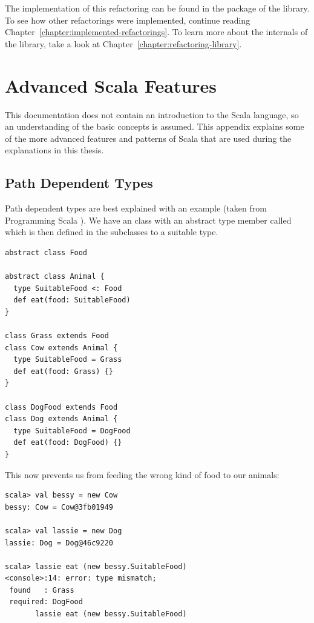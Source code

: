 \documentclass[10pt,a4paper,oneside]{scrreprt}
\begin{document}
The implementation of this refactoring can be found in the  package of the library. To see how other refactorings were implemented, continue reading Chapter~\vref{chapter:implemented-refactorings}. To learn more about the internals of the library, take a look at Chapter~\vref{chapter:refactoring-library}.

\label{end-chapter:developer-how-to}




\chapter{Advanced Scala Features} \label{chapter:advanced-scala-features}

This documentation does not contain an introduction to the Scala language, so an understanding of the basic concepts is assumed. This appendix explains some of the more advanced features and patterns of Scala that are used during the explanations in this thesis.

\section{Path Dependent Types} \label{section:path-dependent-types}

Path dependent types are best explained with an example (taken from Programming Scala \cite{ProgrammingScala}). We have an  class with an abstract type member called  which is then defined in the subclasses to a suitable type.
\begin{lstlisting}
abstract class Food

abstract class Animal {
  type SuitableFood <: Food
  def eat(food: SuitableFood)
}

class Grass extends Food
class Cow extends Animal {
  type SuitableFood = Grass
  def eat(food: Grass) {}
}

class DogFood extends Food
class Dog extends Animal {
  type SuitableFood = DogFood
  def eat(food: DogFood) {}
}
\end{lstlisting}

This now prevents us from feeding the wrong kind of food to our animals:

\begin{lstlisting}
scala> val bessy = new Cow
bessy: Cow = Cow@3fb01949

scala> val lassie = new Dog
lassie: Dog = Dog@46c9220

scala> lassie eat (new bessy.SuitableFood)
<console>:14: error: type mismatch;
 found   : Grass
 required: DogFood
       lassie eat (new bessy.SuitableFood)
\end{lstlisting}
\end{document}
